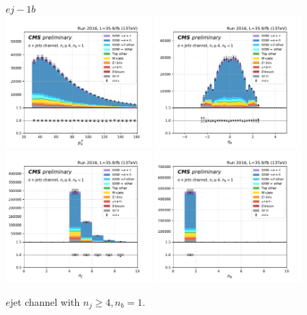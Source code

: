 \begin{figure}[ht]
    \centering
    $e j- 1b$ \\
    \includegraphics[width=0.49\textwidth]{chapters/Appendix/sectionPlots/figures/kinematics_pickles/e4j/1b/e4j_1b_lepton1_pt.pdf}
    \includegraphics[width=0.49\textwidth]{chapters/Appendix/sectionPlots/figures/kinematics_pickles/e4j/1b/e4j_1b_lepton1_eta.pdf}
    \includegraphics[width=0.49\textwidth]{chapters/Appendix/sectionPlots/figures/kinematics_pickles/e4j/1b/e4j_1b_nJets.pdf}
    \includegraphics[width=0.49\textwidth]{chapters/Appendix/sectionPlots/figures/kinematics_pickles/e4j/1b/e4j_1b_nBJets.pdf}
    
    \caption{$e$jet channel with $n_j\geq4, n_b=1$.}
\end{figure}


